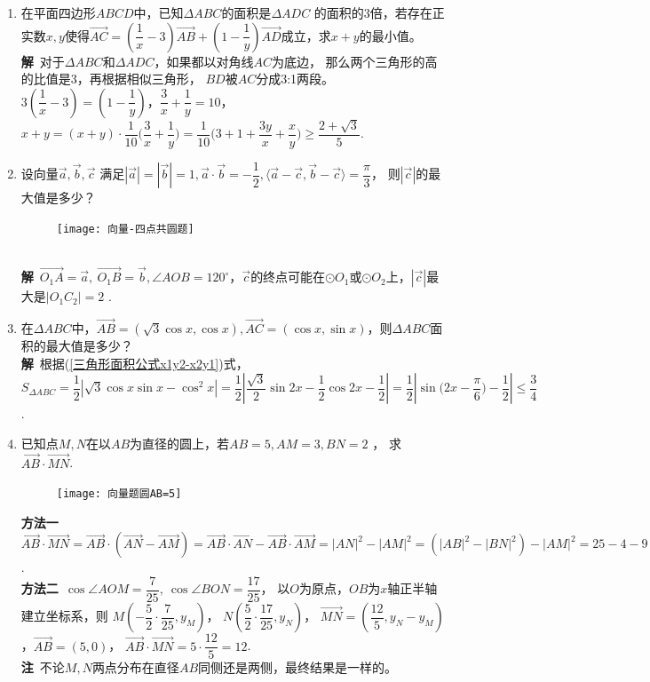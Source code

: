 \begin{enumerate}[label={【\textbf{例\thechapter.\arabic*}】},
 leftmargin=\inteval{\myenumleftmargin}pt,
 itemsep=\inteval{\myenumitempsep}pt,
 itemindent=\inteval{\myenumitemindent}pt]
\item 在平面四边形$ ABCD $中，已知$ \Delta ABC $的面积是$ \Delta ADC $
的面积的3倍，若存在正实数$ x,y $使得$ \vec{AC}=\left(\dfrac{1}{x}-3
\right)\vec{AB}+\left(1-\dfrac{1}{y} 
\right)\vec{AD} $成立，求$ x+y $的最小值。\\
\textbf{解}\ 对于$ \Delta ABC $和$ \Delta ADC $，如果都以对角线$ AC $为底边，
那么两个三角形的高的比值是3，再根据相似三角形，
$ BD $被$ AC $分成3:1两段。$ 3\left(\dfrac{1}{x}-3 \right)=\left(1-
\dfrac{1}{y} \right) $，$ \dfrac{3}{x}+\dfrac{1}{y}=10 $，
$ x+y=(x+y)\cdot\dfrac{1}{10}\Big(\dfrac{3}{x}+\dfrac{1}{y}\Big)=
\dfrac{1}{10}\Big(3+1+\dfrac{3y}{x}+\dfrac{x}{y}\Big)
\geq\dfrac{2+\sqrt{3}}{5} $. 

\item 设向量$ \vec{a},\vec{b},\vec{c} $
满足$ |\vec{a}|=|\vec{b}|=1,\vec{a}\cdot
\vec{b}=-\dfrac{1}{2},\langle\vec{a}-\vec{c},
\vec{b}-\vec{c}\rangle=\dfrac{\pi}{3} $，
则$ |\vec{c}| $的最大值是多少？
\begin{figure}[h]
    \centering
    \texttt{[image: 向量-四点共圆题]}
\end{figure} \\
\textbf{解}\ $ \vec{O_1A}=\vec{a},\ \vec{O_1B}=
\vec{b},\angle AOB=120^\circ $，$ \vec{c} $的终点可能在$ \odot 
O_1 $或$ \odot O_2 $上，$ |\vec{c}| $最大是$ |O_1C_2|=2 $ .

\item 在$ \Delta ABC $中，$ \vec{AB}=(\sqrt{3}\cos x,\cos x),
\vec{AC}=(\cos x,\sin x) $，则$ \Delta ABC $面积的最大值是多少？\\
\textbf{解}\ 根据(\ref{三角形面积公式x1y2-x2y1})式，$ S_{\Delta ABC}=\dfrac{1}{2}
\left|\sqrt{3}\cos x\sin x-\cos^2 x\right|=\dfrac{1}{2}\left|\dfrac{\sqrt{3}}{2}
\sin 2x-\dfrac{1}{2}\cos 2x-\dfrac{1}{2}\right|
=\dfrac{1}{2}\left|\sin\Big(2x-\dfrac{\pi}{6}\Big)-\dfrac{1}{2}\right|
\leq \dfrac{3}{4} $. 

\item 已知点$ M,N $在以$ AB $为直径的圆上，若$ AB=5,AM=3,BN=2 $ ，
求$ \vec{AB}\cdot\vec{MN} $. 
\begin{figure}[H]
    \centering
    \texttt{[image: 向量题圆AB=5]}
\end{figure}
\noindent\textbf{方法一}\ $ \vec{AB}\cdot\vec{MN}=\vec{AB}
\cdot(\vec{AN}-\vec{AM})=\vec{AB}\cdot
\vec{AN}-\vec{AB}\cdot\vec{AM}=
|AN|^2-|AM|^2=(|AB|^2-|BN|^2)-|AM|^2=25-4-9=12 $. \\
\textbf{方法二}\ $ \cos\angle AOM=\dfrac{7}{25},\ \cos\angle BON=\dfrac{17}{25} $，
以$ O $为原点，$ OB $为$ x $轴正半轴建立坐标系，则
$ M\left(-\dfrac{5}{2}\cdot\dfrac{7}{25},y_M\right) $，
$ N\left(\dfrac{5}{2}\cdot\dfrac{17}{25},y_N\right) $，
$ \vec{MN}=\left(\dfrac{12}{5},y_N-y_M\right) $，$ \vec{AB}=(5,0) $，
$ \vec{AB}\cdot\vec{MN}=5\cdot\dfrac{12}{5}=12 $. \\
\textbf{注}\ 不论$ M,N $两点分布在直径$ AB $同侧还是两侧，最终结果是一样的。


\end{enumerate}

